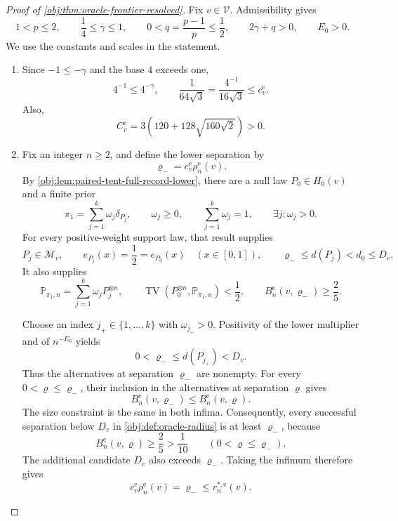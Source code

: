 \begin{proof}[Proof of \cref{obj:thm:oracle-frontier-resolved}]
Fix \(v\in\mathcal V\). Admissibility gives
\[
1<p\le2,\qquad \frac14\le\gamma\le1,\qquad
0<q=\frac{p-1}{p}\le\frac12,\qquad
2\gamma+q>0,\qquad E_0>0.
\]
We use the constants and scales in the statement.

\begin{enumerate}
\item Since \(-1\le-\gamma\) and the base \(4\) exceeds one,
\[
4^{-1}\le4^{-\gamma},
\qquad
\frac{1}{64\sqrt3}
=\frac{4^{-1}}{16\sqrt3}
\le c^{\mathrm e}_v.
\]
Also,
\[
C^{\mathrm e}_v
=3\left(120+128\sqrt{160\sqrt2}\right)>0.
\]

\item Fix an integer \(n\ge2\), and define the lower separation by
\[
\varrho_-=c^{\mathrm e}_v\rho_n^{\mathrm e}(v).
\]
By \cref{obj:lem:paired-tent-full-record-lower}, there are a null law \(P_0\in H_0(v)\) and a finite prior
\[
\pi_1=\sum_{j=1}^{k}\omega_j\delta_{P_j},
\qquad
\omega_j\ge0,\qquad
\sum_{j=1}^{k}\omega_j=1,
\qquad
\exists j:\omega_j>0.
\]
For every positive-weight support law, that result supplies
\[
P_j\in\mathcal M_v,\qquad
e_{P_j}(x)=\frac12=e_{P_0}(x)\quad(x\in[0,1]),
\qquad
\varrho_-\le d(P_j)<d_0\le D_v.
\]
It also supplies
\[
\mathbb P_{\pi_1,n}
=\sum_{j=1}^{k}\omega_jP_j^{\otimes n},
\qquad
\operatorname{TV}\!\left(P_0^{\otimes n},\mathbb P_{\pi_1,n}\right)<\frac12,
\qquad
B_n^{\mathrm e}(v,\varrho_-)\ge\frac25.
\]

Choose an index \(j_+\in\{1,\ldots,k\}\) with \(\omega_{j_+}>0\). Positivity of the lower multiplier and of \(n^{-E_0}\) yields
\[
0<\varrho_-\le d(P_{j_+})<D_v.
\]
Thus the alternatives at separation \(\varrho_-\) are nonempty. For every \(0<\varrho\le\varrho_-\), their inclusion in the alternatives at separation \(\varrho\) gives
\[
B_n^{\mathrm e}(v,\varrho_-)
\le B_n^{\mathrm e}(v,\varrho).
\]
The size constraint is the same in both infima. Consequently, every successful separation below \(D_v\) in \cref{obj:def:oracle-radius} is at least \(\varrho_-\), because
\[
B_n^{\mathrm e}(v,\varrho)\ge\frac25>\frac1{10}
\qquad(0<\varrho\le\varrho_-).
\]
The additional candidate \(D_v\) also exceeds \(\varrho_-\). Taking the infimum therefore gives
\[
c^{\mathrm e}_v\rho_n^{\mathrm e}(v)
=\varrho_-\le r_n^{*,\mathrm e}(v).
\]


\end{enumerate}
\end{proof}
